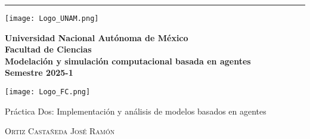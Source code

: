 
\begin{titlepage}
    \begin{center}
        \rule{17cm}{0.1mm}
    \end{center}
    \begin{center}
        \begin{minipage}{3cm}
            \begin{center}
                \texttt{[image: Logo\_UNAM.png]}
            \end{center}
        \end{minipage}\hfill
        \begin{minipage}{10cm}
    
            \begin{center}
                \large
                \textbf{ Universidad Nacional Autónoma de México}\\[0.1cm]
                \textbf{Facultad de Ciencias}\\[0.1cm]
                \textbf{Modelación y simulación computacional
basada en agentes}\\[0.1cm]
                \textbf{Semestre 2025-1}\\[0.1cm]
            \end{center}
        \end{minipage}\hfill
        \begin{minipage}{3cm}
            \begin{center}
                \texttt{[image: Logo\_FC.png]}
            \end{center}
        \end{minipage}
    \end{center}

    \vspace{2cm}
    
    \begin{center}
        {\Huge Práctica Dos: Implementación y análisis de modelos basados en agentes}
    \end{center}
    
    \vspace{2cm}
    
    \begin{center}
        \large

        \textsc{Ortiz Castañeda José Ramón}\\[0.5cm]     
                

\end{center}
\end{titlepage}
